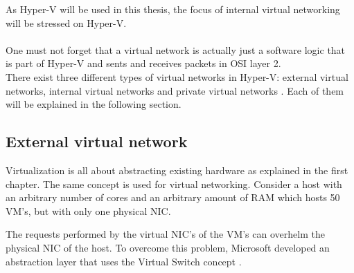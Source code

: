 As Hyper-V will be used in this thesis, the focus of internal virtual networking will be stressed on Hyper-V. \\ \\

One must not forget that a virtual network is actually just a software logic that is part of Hyper-V and sents and receives packets in OSI layer 2. \\

There exist three different types of virtual networks in Hyper-V: external virtual networks, internal virtual networks and private virtual networks \citep{HyperVNetworking2}. Each of them will be explained in the following section.

\subsection{External virtual network}

Virtualization is all about abstracting existing hardware as explained in the first chapter. The same concept is used for virtual networking. Consider a host with an arbitrary number of cores and an arbitrary amount of RAM which hosts 50 VM's, but with only one physical NIC.

The requests performed by the virtual NIC's of the VM's can overhelm the physical NIC of the host. To overcome this problem, Microsoft developed an abstraction layer that uses the Virtual Switch concept \citep{HyperVNetworking1}.

